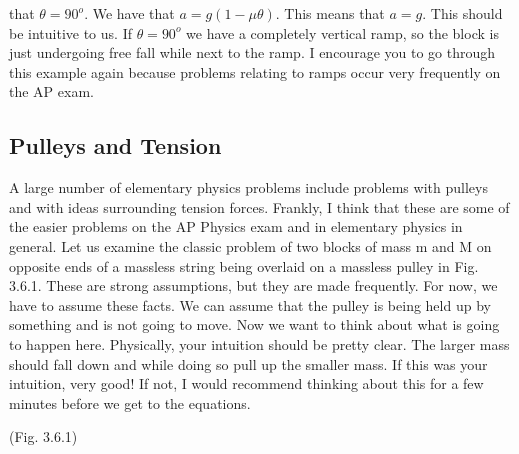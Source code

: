 \documentclass{article}[gray]
\numberwithin{equation}{subsection}
\begin{document}
that $\theta=90^o $. We have that $a=g\left(1-\mu \theta \right)$. This means that $a=g$. This should be intuitive to us. If $\theta=90^o$ we have a completely vertical ramp, so the block is just undergoing free fall while next to the ramp. I encourage you to go through this example again because problems relating to ramps occur very frequently on the AP exam. 

\subsection{Pulleys and Tension}

A large number of elementary physics problems include problems with pulleys and with ideas surrounding tension forces. Frankly, I think that these are some of the easier problems on the AP Physics exam and in elementary physics in general. Let us examine the classic problem of two blocks of mass m and M on opposite ends of a massless string being overlaid on a massless pulley in Fig. 3.6.1. These are strong assumptions, but they are made frequently. For now, we have to assume these facts. We can assume that the pulley is being held up by something and is not going to move. Now we want to think about what is going to happen here. Physically, your intuition should be pretty clear. The larger mass should fall down and while doing so pull up the smaller mass. If this was your intuition, very good! If not, I would recommend thinking about this for a few minutes before we get to the equations. 
\newline
\newline
{}
\begin{center} 
(Fig. 3.6.1)
\end{center}
\end{document}
